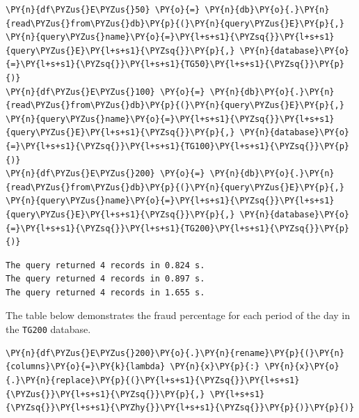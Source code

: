     \begin{tcolorbox}[breakable, size=fbox, boxrule=1pt, pad at break*=1mm,colback=cellbackground, colframe=cellborder]
\begin{Verbatim}[commandchars=\\\{\}]
\PY{n}{df\PYZus{}E\PYZus{}50} \PY{o}{=} \PY{n}{db}\PY{o}{.}\PY{n}{read\PYZus{}from\PYZus{}db}\PY{p}{(}\PY{n}{query\PYZus{}E}\PY{p}{,} \PY{n}{query\PYZus{}name}\PY{o}{=}\PY{l+s+s1}{\PYZsq{}}\PY{l+s+s1}{query\PYZus{}E}\PY{l+s+s1}{\PYZsq{}}\PY{p}{,} \PY{n}{database}\PY{o}{=}\PY{l+s+s1}{\PYZsq{}}\PY{l+s+s1}{TG50}\PY{l+s+s1}{\PYZsq{}}\PY{p}{)}
\PY{n}{df\PYZus{}E\PYZus{}100} \PY{o}{=} \PY{n}{db}\PY{o}{.}\PY{n}{read\PYZus{}from\PYZus{}db}\PY{p}{(}\PY{n}{query\PYZus{}E}\PY{p}{,} \PY{n}{query\PYZus{}name}\PY{o}{=}\PY{l+s+s1}{\PYZsq{}}\PY{l+s+s1}{query\PYZus{}E}\PY{l+s+s1}{\PYZsq{}}\PY{p}{,} \PY{n}{database}\PY{o}{=}\PY{l+s+s1}{\PYZsq{}}\PY{l+s+s1}{TG100}\PY{l+s+s1}{\PYZsq{}}\PY{p}{)}
\PY{n}{df\PYZus{}E\PYZus{}200} \PY{o}{=} \PY{n}{db}\PY{o}{.}\PY{n}{read\PYZus{}from\PYZus{}db}\PY{p}{(}\PY{n}{query\PYZus{}E}\PY{p}{,} \PY{n}{query\PYZus{}name}\PY{o}{=}\PY{l+s+s1}{\PYZsq{}}\PY{l+s+s1}{query\PYZus{}E}\PY{l+s+s1}{\PYZsq{}}\PY{p}{,} \PY{n}{database}\PY{o}{=}\PY{l+s+s1}{\PYZsq{}}\PY{l+s+s1}{TG200}\PY{l+s+s1}{\PYZsq{}}\PY{p}{)}
\end{Verbatim}
\end{tcolorbox}

    \begin{Verbatim}[commandchars=\\\{\}]
The query returned 4 records in 0.824 s.
The query returned 4 records in 0.897 s.
The query returned 4 records in 1.655 s.
    \end{Verbatim}

    The table below demonstrates the fraud percentage for each period of the
day in the \texttt{TG200} database.

    \begin{tcolorbox}[breakable, size=fbox, boxrule=1pt, pad at break*=1mm,colback=cellbackground, colframe=cellborder]
\begin{Verbatim}[commandchars=\\\{\}]
\PY{n}{df\PYZus{}E\PYZus{}200}\PY{o}{.}\PY{n}{rename}\PY{p}{(}\PY{n}{columns}\PY{o}{=}\PY{k}{lambda} \PY{n}{x}\PY{p}{:} \PY{n}{x}\PY{o}{.}\PY{n}{replace}\PY{p}{(}\PY{l+s+s1}{\PYZsq{}}\PY{l+s+s1}{\PYZus{}}\PY{l+s+s1}{\PYZsq{}}\PY{p}{,} \PY{l+s+s1}{\PYZsq{}}\PY{l+s+s1}{\PYZhy{}}\PY{l+s+s1}{\PYZsq{}}\PY{p}{)}\PY{p}{)}
\end{Verbatim}
\end{tcolorbox}
 
